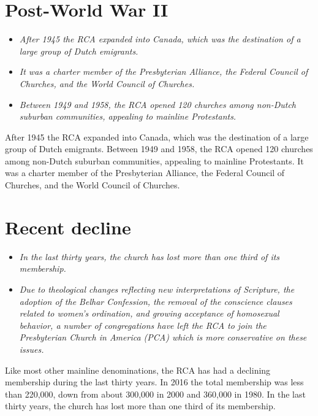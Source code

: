 \section{Post-World War II}\label{post-world-war-ii}

\begin{itemize}
\item
  \emph{After 1945 the RCA expanded into Canada, which was the
  destination of a large group of Dutch emigrants.}
\item
  \emph{It was a charter member of the Presbyterian Alliance, the
  Federal Council of Churches, and the World Council of Churches.}
\item
  \emph{Between 1949 and 1958, the RCA opened 120 churches among
  non-Dutch suburban communities, appealing to mainline Protestants.}
\end{itemize}

After 1945 the RCA expanded into Canada, which was the destination of a
large group of Dutch emigrants. Between 1949 and 1958, the RCA opened
120 churches among non-Dutch suburban communities, appealing to mainline
Protestants. It was a charter member of the Presbyterian Alliance, the
Federal Council of Churches, and the World Council of Churches.

\section{Recent decline}\label{recent-decline}

\begin{itemize}
\item
  \emph{In the last thirty years, the church has lost more than one
  third of its membership.}
\item
  \emph{Due to theological changes reflecting new interpretations of
  Scripture, the adoption of the Belhar Confession, the removal of the
  conscience clauses related to women's ordination, and growing
  acceptance of homosexual behavior, a number of congregations have left
  the RCA to join the Presbyterian Church in America (PCA) which is more
  conservative on these issues.}
\end{itemize}

Like most other mainline denominations, the RCA has had a declining
membership during the last thirty years. In 2016 the total membership
was less than 220,000, down from about 300,000 in 2000 and 360,000 in
1980. In the last thirty years, the church has lost more than one third
of its membership.

